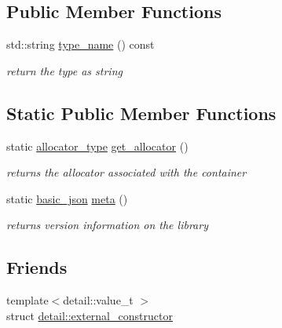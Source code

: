 \subsection*{Public Member Functions}
\begin{DoxyCompactItemize}
\item 
std\+::string \mbox{\hyperlink{classnlohmann_1_1basic__json_a6b75862bdb4d26650616cf9821430755}{type\+\_\+name}} () const
\begin{DoxyCompactList}\small\item\em return the type as string \end{DoxyCompactList}\end{DoxyCompactItemize}
\subsection*{Static Public Member Functions}
\begin{DoxyCompactItemize}
\item 
static \mbox{\hyperlink{classnlohmann_1_1basic__json_a86ce930490cf7773b26f5ef49c04a350}{allocator\+\_\+type}} \mbox{\hyperlink{classnlohmann_1_1basic__json_af4ac14224fbdd29d3547fcb11bb55c8f}{get\+\_\+allocator}} ()
\begin{DoxyCompactList}\small\item\em returns the allocator associated with the container \end{DoxyCompactList}\item 
static \mbox{\hyperlink{classnlohmann_1_1basic__json}{basic\+\_\+json}} \mbox{\hyperlink{classnlohmann_1_1basic__json_aef6d0eeccee7c5c7e1317c2ea1607fab}{meta}} ()
\begin{DoxyCompactList}\small\item\em returns version information on the library \end{DoxyCompactList}\end{DoxyCompactItemize}
\subsection*{Friends}
\begin{DoxyCompactItemize}
\item 
{\footnotesize template$<$detail\+::value\+\_\+t $>$ }\\struct \mbox{\hyperlink{classnlohmann_1_1basic__json_a6275ed57bae6866cdf5db5370a7ad47c}{detail\+::external\+\_\+constructor}}
\end{DoxyCompactItemize}
